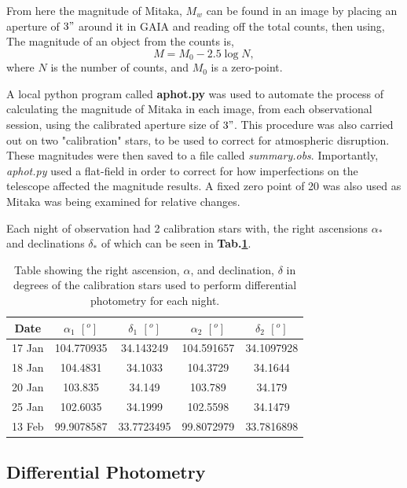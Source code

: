 \documentclass[10pt,twocolumn]{revtex4}    %
\newcommand{\reftab}[1]{\textbf{Tab.#1}}
\begin{document}
From here the magnitude of Mitaka, $M_w$ can be found in an image by placing an aperture of $3"$ around it in GAIA and reading off the total counts, then using,
The magnitude of an object from the counts is,
\begin{equation}\label{eqn:Mag}
    M = M_0 - 2.5\log{N},
\end{equation}
where $N$ is the number of counts, and $M_0$ is a zero-point.

A local python program called \textbf{aphot.py} was used to automate the process of calculating the magnitude of Mitaka in each image, from each observational session, using the calibrated aperture size of $3"$. This procedure was also carried out on two "calibration" stars, to be used to correct for atmospheric disruption. These magnitudes were then saved to a file called \textit{summary.obs}. Importantly, \textit{aphot.py} used a flat-field in order to correct for how imperfections on the telescope affected the magnitude results. A fixed zero point of 20 was also used as Mitaka was being examined for relative changes.  

Each night of observation had 2 calibration stars with, the right ascensions $\alpha_*$ and declinations $\delta_*$ of which can be seen in \reftab{\ref{tab:calStars}}.
\begin{table}[]
    \centering
    \begin{tabular}{c|c|c|c|c}
         Date &  $\alpha_1$ $[^o]$ & $\delta_1$ $[^o]$ & $\alpha_2$ $[^o]$ & $\delta_2$ $[^o]$ \\ \hline
         17 Jan & 104.770935    & 34.143249 & 104.591657 & 34.1097928 \\ 
         18 Jan & 104.4831      & 34.1033   & 104.3729 & 34.1644 \\
         20 Jan & 103.835       & 34.149    & 103.789 & 34.179 \\
         25 Jan & 102.6035      & 34.1999   & 102.5598  & 34.1479 \\
         13 Feb & 99.9078587    & 33.7723495 & 99.8072979 & 33.7816898 \\
    \end{tabular}
    \caption{Table showing the right ascension, $\alpha$, and declination, $\delta$ in degrees of the calibration stars used to perform differential photometry for each night.}
    \label{tab:calStars}
\end{table}

\subsection{Differential Photometry}\label{ssec:diffPhotometry}
\end{document}

